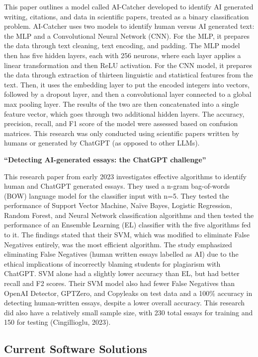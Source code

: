 \documentclass{article} %
\begin{document}
This paper outlines a model called AI-Catcher developed to identify AI generated writing, citations, and data in scientific papers, treated as a binary classification problem. AI-Catcher uses two models to identify human versus AI generated text: the MLP and a Convolutional Neural Network (CNN). For the MLP, it prepares the data through text cleaning, text encoding, and padding. The MLP model then has five hidden layers, each with 256 neurons, where each layer applies a linear transformation and then ReLU activation. For the CNN model, it prepares the data through extraction of thirteen linguistic and statistical features from the text. Then, it uses the embedding layer to put the encoded integers into vectors, followed by a dropout layer, and then a convolutional layer connected to a global max pooling layer. The results of the two are then concatenated into a single feature vector, which goes through two additional hidden layers. The accuracy, precision, recall, and F1 score of the model were assessed based on confusion matrices. This research was only conducted using scientific papers written by humans or generated by ChatGPT (as opposed to other LLMs).

\textbf{``Detecting AI-generated essays: the ChatGPT challenge''} ~\citep{AIessays2023}

This research paper from early 2023 investigates effective algorithms to identify human and ChatGPT generated essays. They used a n-gram bag-of-words (BOW) language model for the classifier input with n=5. They tested the performance of Support Vector Machine, Naïve Bayes, Logistic Regression, Random Forest, and Neural Network classification algorithms and then tested the performance of an Ensemble Learning (EL) classifier with the five algorithms fed to it. The findings stated that their SVM, which was modified to eliminate False Negatives entirely, was the most efficient algorithm. The study emphasized eliminating False Negatives (human written essays labelled as AI) due to the ethical implications of incorrectly blaming students for plagiarism with ChatGPT. SVM alone had a slightly lower accuracy than EL, but had better recall and F2 scores. Their SVM model also had fewer False Negatives than OpenAI Detector, GPTZero, and Copyleaks on test data and a 100\% accuracy in detecting human-written essays, despite a lower overall accuracy. This research did also have a relatively small sample size, with 230 total essays for training and 150 for testing (Cingillioglu, 2023).

\subsection{Current Software Solutions}
\end{document}
